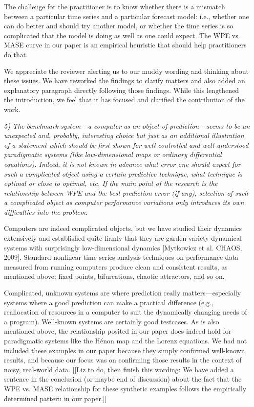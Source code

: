 \documentclass[12pt]{article}
\newcommand{\alert}[1]{{\color{red}#1}}
\begin{document}
The challenge for the practitioner is to know whether there is a
mismatch between a particular time series and a particular forecast
model: i.e., whether one can do better and should try another model,
or whether the time series is so complicated that the model is doing
as well as one could expect.  The WPE vs. MASE curve in our paper is
an empirical heuristic that should help practitioners do that.

We appreciate the reviewer alerting us to our muddy wording and
thinking about these issues.  We have reworked the findings to clarify
matters and also added an explanatory paragraph directly following
those findings.  While this lengthened the introduction, we feel that
it has focused and clarified the contribution of the work.

\smallskip

\emph{5) The benchmark system - a computer as an object of prediction
  - seems to be an unexpected and, probably, interesting choice but
  just as an additional illustration of a statement which should be
  first shown for well-controlled and well-understood paradigmatic
  systems (like low-dimensional maps or ordinary differential
  equations). Indeed, it is not known in advance what error one should
  expect for such a complicated object using a certain predictive
  technique, what technique is optimal or close to optimal, etc. If
  the main point of the research is the relationship between WPE and
  the best prediction error (if any), selection of such a complicated
  object as computer performance variations only introduces its own
  difficulties into the problem.}

Computers are indeed complicated objects, but we have studied their
dynamics extensively and established quite firmly that they are
garden-variety dynamical systems with surprisingly low-dimensional
dynamics [Mytkowicz et al. CHAOS, 2009].  Standard nonlinear
time-series analysis techniques on performance data measured from
running computers produce clean and consistent results, as mentioned
above: fixed points, bifurcations, chaotic attractors, and so on.

Complicated, unknown systems are where prediction really
matters---especially systems where a good prediction can make a
practical difference (e.g., reallocation of resources in a computer to
suit the dynamically changing needs of a program).  Well-known systems
are certainly good testcases.  As is also mentioned above, the
relationship posited in our paper does indeed hold for paradigmatic
systems like the H\'{e}non map and the Lorenz equations.  We had not
included these examples in our paper because they simply confirmed
well-known results, and because our focus was on confirming those
results in the context of noisy, real-world data.  \alert{[[Liz to do,
      then finish this wording: We have added a sentence in the
      conclusion (or maybe end of discussion) about the fact that the
      WPE vs. MASE relationship for these synthetic examples follows
      the empirically determined pattern in our paper.]]}
\end{document}
